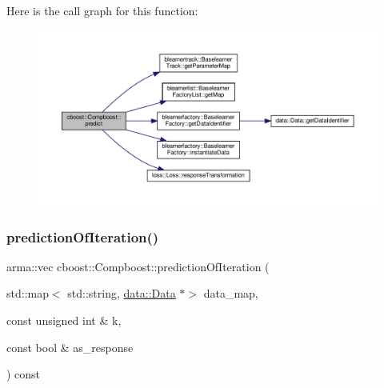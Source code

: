 Here is the call graph for this function\+:
\nopagebreak
\begin{figure}[H]
\begin{center}
\leavevmode
\includegraphics[width=350pt]{classcboost_1_1_compboost_a51c59cdddec77c2bed757aadad6afe1d_cgraph}
\end{center}
\end{figure}
\mbox{\label{classcboost_1_1_compboost_abd00401a8914cde27a93673e12ab3468}} 
\subsubsection{\texorpdfstring{prediction\+Of\+Iteration()}{predictionOfIteration()}}
{\footnotesize\ttfamily arma\+::vec cboost\+::\+Compboost\+::prediction\+Of\+Iteration (\begin{DoxyParamCaption}\item[{std\+::map$<$ std\+::string, \hyperlink{classdata_1_1_data}{data\+::\+Data} $\ast$$>$}]{data\+\_\+map,  }\item[{const unsigned int \&}]{k,  }\item[{const bool \&}]{as\+\_\+response }\end{DoxyParamCaption}) const}

